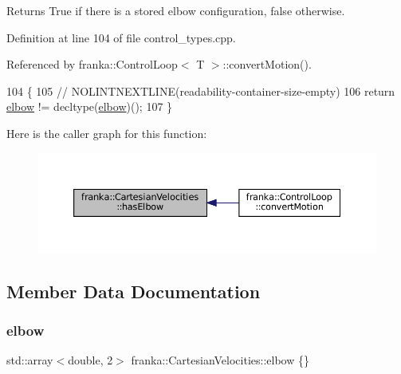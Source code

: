 \begin{DoxyReturn}{Returns}
True if there is a stored elbow configuration, false otherwise. 
\end{DoxyReturn}


Definition at line 104 of file control\+\_\+types.\+cpp.



Referenced by franka\+::\+Control\+Loop$<$ T $>$\+::convert\+Motion().


\begin{DoxyCode}
104                                                   \{
105   \textcolor{comment}{// NOLINTNEXTLINE(readability-container-size-empty)}
106   \textcolor{keywordflow}{return} \hyperlink{classfranka_1_1CartesianVelocities_a6419df1399d3dfab79b1654b94ced344}{elbow} != decltype(\hyperlink{classfranka_1_1CartesianVelocities_a6419df1399d3dfab79b1654b94ced344}{elbow})();
107 \}
\end{DoxyCode}
Here is the caller graph for this function\+:
\nopagebreak
\begin{figure}[H]
\begin{center}
\leavevmode
\includegraphics[width=350pt]{classfranka_1_1CartesianVelocities_a51a41893b10250982597fe367abb2ca6_icgraph}
\end{center}
\end{figure}


\subsection{Member Data Documentation}
\mbox{\label{classfranka_1_1CartesianVelocities_a6419df1399d3dfab79b1654b94ced344}} 
\subsubsection{\texorpdfstring{elbow}{elbow}}
{\footnotesize\ttfamily std\+::array$<$double, 2$>$ franka\+::\+Cartesian\+Velocities\+::elbow \{\}}

